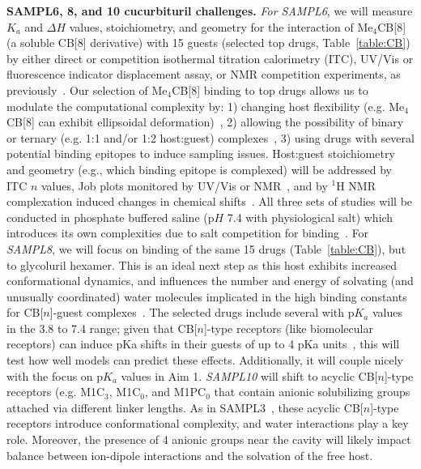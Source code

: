 \documentclass[11pt]{article}
\begin{document}
\textbf{SAMPL6, 8, and 10 cucurbituril challenges.} 
\emph{For SAMPL6}, we will measure $K_a$ and $\Delta H$ values, stoichiometry, and geometry for the interaction of Me$_4$CB[8] (a soluble CB[8] derivative) with 15 guests (selected top drugs, Table~\ref{table:CB}) by either direct or competition isothermal titration calorimetry (ITC), UV/Vis or fluorescence indicator displacement assay, or NMR competition experiments, as previously~\cite{cao_attomolar_2014, liu_cucurbituril_2005, ma_acyclic_2010, she_glycoluril-derived_2016}.  
Our selection of Me$_4$CB[8] binding to top drugs allows us to modulate the computational complexity by: 1) changing host flexibility (e.g. Me$_4$CB[8] can exhibit ellipsoidal deformation)~\cite{vinciguerra_synthesis_2015}, 2) allowing the possibility of binary or ternary (e.g. 1:1 and/or 1:2 host:guest) complexes~\cite{ko_supramolecular_2007, barrow_cucurbituril-based_2015, urbach_molecular_2011}, 3) using drugs with several potential binding epitopes to induce sampling issues.  Host:guest stoichiometry and geometry (e.g., which binding epitope is complexed) will be addressed by ITC $n$ values, Job plots monitored by UV/Vis or NMR~\cite{connors_binding_1987}, and by $^1$H NMR complexation induced changes in chemical shifts~\cite{masson_cucurbituril_2012}.  
All three sets of studies will be conducted in phosphate buffered saline (p$H$ 7.4 with physiological salt) which introduces its own complexities due to salt competition for binding~\cite{marquez_mechanism_2004, mobley_predicting_2016}. 
For \emph{SAMPL8}, we will focus on binding of the same 15 drugs (Table~\ref{table:CB}), but to glycoluril hexamer. 
This is an ideal next step as this host exhibits increased conformational dynamics, and influences the number and energy of solvating (and unusually coordinated) water molecules implicated in the high binding constants for CB[$n$]-guest complexes~\cite{biedermann_release_2012, biedermann_hydrophobic_2014}.  
The selected drugs include several with p$K_a$ values in the 3.8 to 7.4 range; given that CB[$n$]-type receptors (like biomolecular receptors) can induce pKa shifts in their guests of up to 4 pKa units~\cite{saleh_activation_2008, nau_deep_2011, ghosh_strategic_2012}, this will test how well models can predict these effects. 
Additionally, it will couple nicely with the focus on p$K_a$ values in Aim 1.
\emph{SAMPL10} will shift to acyclic CB[$n$]-type receptors (e.g. M1C$_3$, M1C$_0$, and M1PC$_0$ that contain anionic solubilizing groups attached via different linker lengths.  
As in SAMPL3~\cite{muddana_sampl3_2012}, these acyclic CB[$n$]-type receptors introduce conformational complexity, and water interactions play a key role.
Moreover, the presence of 4 anionic groups near the cavity will likely impact balance between ion-dipole interactions and the solvation of the free host.
\end{document}
